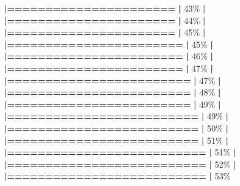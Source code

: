 \documentclass[
]{book}
\newenvironment{Shaded}{\begin{snugshade}}{\end{snugshade}}
\newcommand{\DecValTok}[1]{\textcolor[rgb]{0.00,0.00,0.81}{#1}}
\newcommand{\ErrorTok}[1]{\textcolor[rgb]{0.64,0.00,0.00}{\textbf{#1}}}
\newcommand{\NormalTok}[1]{#1}
\newcommand{\SpecialCharTok}[1]{\textcolor[rgb]{0.81,0.36,0.00}{\textbf{#1}}}
\begin{document}
\begin{Shaded}
\begin{Highlighting}[]
  \ErrorTok{|======================}                            \ErrorTok{|}  \DecValTok{43}\NormalTok{\%}
  \SpecialCharTok{|}                                                        
  \ErrorTok{|======================}                            \ErrorTok{|}  \DecValTok{44}\NormalTok{\%}
  \SpecialCharTok{|}                                                        
  \ErrorTok{|======================}                            \ErrorTok{|}  \DecValTok{45}\NormalTok{\%}
  \SpecialCharTok{|}                                                        
  \ErrorTok{|=======================}                           \ErrorTok{|}  \DecValTok{45}\NormalTok{\%}
  \SpecialCharTok{|}                                                        
  \ErrorTok{|=======================}                           \ErrorTok{|}  \DecValTok{46}\NormalTok{\%}
  \SpecialCharTok{|}                                                        
  \ErrorTok{|=======================}                           \ErrorTok{|}  \DecValTok{47}\NormalTok{\%}
  \SpecialCharTok{|}                                                        
  \ErrorTok{|========================}                          \ErrorTok{|}  \DecValTok{47}\NormalTok{\%}
  \SpecialCharTok{|}                                                        
  \ErrorTok{|========================}                          \ErrorTok{|}  \DecValTok{48}\NormalTok{\%}
  \SpecialCharTok{|}                                                        
  \ErrorTok{|========================}                          \ErrorTok{|}  \DecValTok{49}\NormalTok{\%}
  \SpecialCharTok{|}                                                        
  \ErrorTok{|=========================}                         \ErrorTok{|}  \DecValTok{49}\NormalTok{\%}
  \SpecialCharTok{|}                                                        
  \ErrorTok{|=========================}                         \ErrorTok{|}  \DecValTok{50}\NormalTok{\%}
  \SpecialCharTok{|}                                                        
  \ErrorTok{|=========================}                         \ErrorTok{|}  \DecValTok{51}\NormalTok{\%}
  \SpecialCharTok{|}                                                        
  \ErrorTok{|==========================}                        \ErrorTok{|}  \DecValTok{51}\NormalTok{\%}
  \SpecialCharTok{|}                                                        
  \ErrorTok{|==========================}                        \ErrorTok{|}  \DecValTok{52}\NormalTok{\%}
  \SpecialCharTok{|}                                                        
  \ErrorTok{|==========================}                        \ErrorTok{|}  \DecValTok{53}\NormalTok{\%}

\end{Highlighting}
\end{Shaded}
\end{document}
